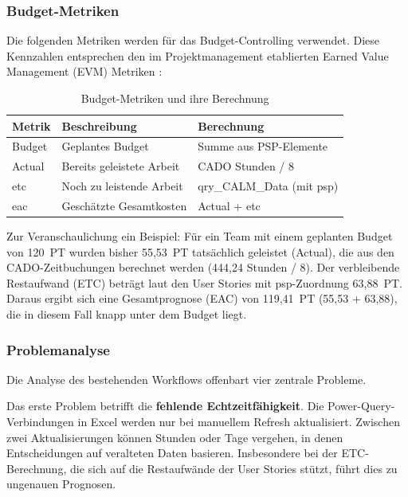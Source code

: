 \subsubsection{Budget-Metriken}

Die folgenden Metriken werden für das Budget-Controlling verwendet. Diese Kennzahlen entsprechen den im Projektmanagement etablierten Earned Value Management (EVM) Metriken \citep{kerzner2017, pmi2021}:

\begin{table}[H]
\centering
\caption{Budget-Metriken und ihre Berechnung}
\label{tab:metriken}
\begin{tabularx}{\textwidth}{l>{\raggedright\arraybackslash}Xl}
\toprule
\textbf{Metrik} & \textbf{Beschreibung} & \textbf{Berechnung} \\
\midrule
Budget & Geplantes Budget & Summe aus PSP-Elemente \\
Actual & Bereits geleistete Arbeit & CADO Stunden / 8 \\
\gls{etc} & Noch zu leistende Arbeit & qry\_CALM\_Data (mit \gls{psp}) \\
\gls{eac} & Geschätzte Gesamtkosten & Actual + \gls{etc} \\
\bottomrule
\end{tabularx}
\end{table}

Zur Veranschaulichung ein Beispiel: Für ein Team mit einem geplanten Budget von 120~PT wurden bisher 55,53~PT tatsächlich geleistet (Actual), die aus den CADO-Zeitbuchungen berechnet werden (444,24 Stunden / 8). Der verbleibende Restaufwand (ETC) beträgt laut den User Stories mit \gls{psp}-Zuordnung 63,88~PT. Daraus ergibt sich eine Gesamtprognose (EAC) von 119,41~PT (55,53 + 63,88), die in diesem Fall knapp unter dem Budget liegt.

\subsubsection{Problemanalyse}

Die Analyse des bestehenden Workflows offenbart vier zentrale Probleme.

Das erste Problem betrifft die \textbf{fehlende Echtzeitfähigkeit}. Die Power-Query-Verbindungen in Excel werden nur bei manuellem Refresh aktualisiert. Zwischen zwei Aktualisierungen können Stunden oder Tage vergehen, in denen Entscheidungen auf veralteten Daten basieren. Insbesondere bei der ETC-Berechnung, die sich auf die Restaufwände der User Stories stützt, führt dies zu ungenauen Prognosen.

